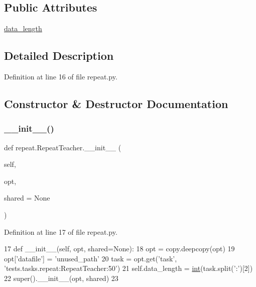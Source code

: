 \subsection*{Public Attributes}
\begin{DoxyCompactItemize}
\item 
\hyperlink{classrepeat_1_1RepeatTeacher_abc46f01649c8af2c60124d7946a95e98}{data\+\_\+length}
\end{DoxyCompactItemize}


\subsection{Detailed Description}


Definition at line 16 of file repeat.\+py.



\subsection{Constructor \& Destructor Documentation}
\mbox{\label{classrepeat_1_1RepeatTeacher_a47b110b0dcdf457e357f1824fb348657}} 
\subsubsection{\texorpdfstring{\+\_\+\+\_\+init\+\_\+\+\_\+()}{\_\_init\_\_()}}
{\footnotesize\ttfamily def repeat.\+Repeat\+Teacher.\+\_\+\+\_\+init\+\_\+\+\_\+ (\begin{DoxyParamCaption}\item[{}]{self,  }\item[{}]{opt,  }\item[{}]{shared = {\ttfamily None} }\end{DoxyParamCaption})}



Definition at line 17 of file repeat.\+py.


\begin{DoxyCode}
17     \textcolor{keyword}{def }\_\_init\_\_(self, opt, shared=None):
18         opt = copy.deepcopy(opt)
19         opt[\textcolor{stringliteral}{'datafile'}] = \textcolor{stringliteral}{'unused\_path'}
20         task = opt.get(\textcolor{stringliteral}{'task'}, \textcolor{stringliteral}{'tests.tasks.repeat:RepeatTeacher:50'})
21         self.data\_length = \hyperlink{namespacelanguage__model_1_1eval__ppl_a7d12ee00479673c5c8d1f6d01faa272a}{int}(task.split(\textcolor{stringliteral}{':'})[2])
22         super().\_\_init\_\_(opt, shared)
23 
\end{DoxyCode}


